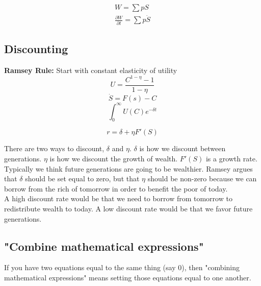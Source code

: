 \documentclass[12pt]{article}
\begin{document}
\begin{align}
    W =\sum pS\\
    \frac{\partial W}{\partial t} = \sum p \dot S
\end{align}

\subsection{Discounting}
\textbf{Ramsey Rule:} Start with constant elasticity of utility 
$$U = \frac{C^{1 - \eta} - 1}{1 - \eta}$$
$$\dot S = F(s) - C$$
$$\int_0^\infty U(C) e^{-\delta t}$$

$$r = \delta + \eta F'(S)$$

There are two ways to discount, $\delta$ and $\eta$. $\delta$ is how we discount between generations. $\eta$ is how we discount the growth of wealth. $F'(S)$ is a growth rate. Typically we think future generations are going to be wealthier. Ramsey argues that $\delta$ should be set equal to zero, but that $\eta$ should be non-zero because we can borrow from the rich of tomorrow in order to benefit the poor of today.\\

A high discount rate would be that we need to borrow from tomorrow to redistribute wealth to today. A low discount rate would be that we favor future generations. 

\subsection{"Combine mathematical expressions"}
If you have two equations equal to the same thing (say 0), then "combining mathematical expressions" means setting those equations equal to one another. 
\end{document}
